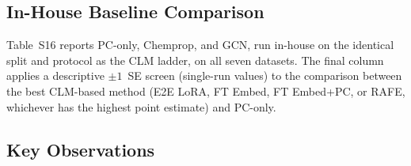 \documentclass[9pt,a4paper]{article}
\begin{document}

\subsection*{In-House Baseline Comparison}

Table~S16 reports PC-only, Chemprop, and GCN, run in-house on the identical split
and protocol as the CLM ladder, on all seven datasets. The final column applies
a descriptive $\pm1$~SE screen (single-run values) to the comparison between the best
CLM-based method (E2E LoRA, FT Embed, FT Embed+PC, or RAFE, whichever has the
highest point estimate) and PC-only.


\begin{table}[htbp]
\centering
\caption{In-house PC-only/Chemprop/GCN baselines vs.\ the best CLM-based
method, all seven datasets. Primary metric: MCC (classification), Spearman
(regression). The last column is a descriptive $\pm1$~SE screen of single-run values; the paired comparisons of the controlled experiment are in Table~\ref{tab:supp_paired}.}
\label{tab:s11_inhouse}
\end{table}

\subsection*{Key Observations}
\end{document}
